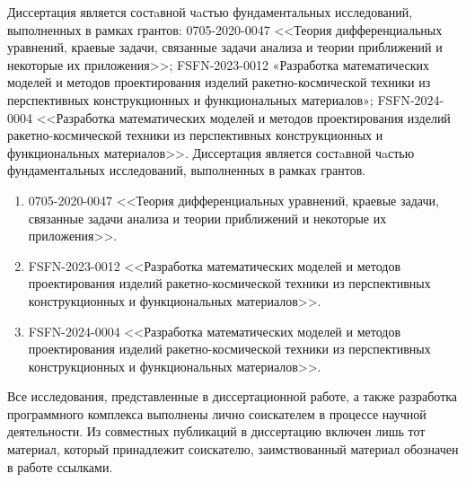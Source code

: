 \ifsynopsis
Диссертация является состaвной чaстью фундаментальных исследований, выполненных в рамках грантов: 0705-2020-0047 <<Теория дифференциальных уравнений, краевые задачи, связанные задачи анализа и теории приближений и некоторые их приложения>>; FSFN-2023-0012 «Разработка математических моделей и методов проектирования изделий ракетно-космической техники из перспективных конструкционных и функциональных материалов»; FSFN-2024-0004 <<Разработка математических моделей и методов проектирования изделий ракетно-космической техники из перспективных конструкционных и функциональных материалов>>.
\else
Диссертация является состaвной чaстью фундаментальных исследований, выполненных в рамках грантов.
\begin{enumerate}
	\item 0705-2020-0047 <<Теория дифференциальных уравнений, краевые задачи, связанные задачи анализа и теории приближений и некоторые их приложения>>.
	\item FSFN-2023-0012 <<Разработка математических моделей и методов проектирования изделий ракетно-космической техники из перспективных конструкционных и функциональных материалов>>.
	\item FSFN-2024-0004 <<Разработка математических моделей и методов проектирования изделий ракетно-космической техники из перспективных конструкционных и функциональных материалов>>.
\end{enumerate}
\fi

{\contribution}
Все исследования, представленные в диссертационной работе, а также разработка программного комплекса выполнены лично соискателем в процессе научной деятельности. Из совместных публикаций в диссертацию включен лишь тот материал, который принадлежит соискателю, заимствованный материал обозначен в работе ссылками.

